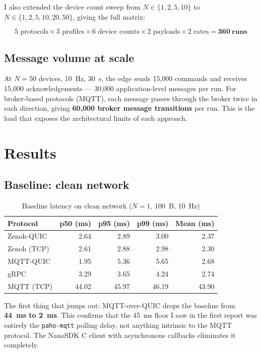\documentclass[11pt,a4paper]{article}
\begin{document}
I also extended the device count sweep from $N \in \{1, 2, 5, 10\}$ to $N \in \{1, 2, 5, 10, 20, 50\}$, giving the full matrix:

\[
5 \text{ protocols} \times 3 \text{ profiles} \times 6 \text{ device counts} \times 2 \text{ payloads} \times 2 \text{ rates} = \mathbf{360\ runs}
\]

\subsection*{Message volume at scale}

At $N=50$ devices, 10~Hz, 30~s, the edge sends 15,000 commands and receives 15,000 acknowledgements --- 30,000 application-level messages per run. For broker-based protocols (MQTT), each message passes through the broker twice in each direction, giving \textbf{60,000 broker message transitions} per run. This is the load that exposes the architectural limits of each approach.

\section{Results}

\subsection{Baseline: clean network}

\begin{table}[H]
\centering
\caption{Baseline latency on clean network ($N=1$, 100~B, 10~Hz)}
\label{tab:clean}
\begin{tabular}{lrrrr}
\toprule
Protocol & p50 (ms) & p95 (ms) & p99 (ms) & Mean (ms) \\
\midrule
Zenoh-QUIC  & 2.64 & 2.89 & 3.00 & 2.37 \\
Zenoh (TCP) & 2.61 & 2.88 & 2.98 & 2.30 \\
MQTT-QUIC   & 1.95 & 5.36 & 5.65 & 2.68 \\
gRPC        & 3.29 & 3.65 & 4.24 & 2.74 \\
MQTT (TCP)  & 44.02 & 45.97 & 46.19 & 43.90 \\
\bottomrule
\end{tabular}
\end{table}

The first thing that jumps out: MQTT-over-QUIC drops the baseline from \textbf{44~ms to 2~ms}. This confirms that the 45~ms floor I saw in the first report was entirely the \texttt{paho-mqtt} polling delay, not anything intrinsic to the MQTT protocol. The NanoSDK C client with asynchronous callbacks eliminates it completely.
\end{document}
